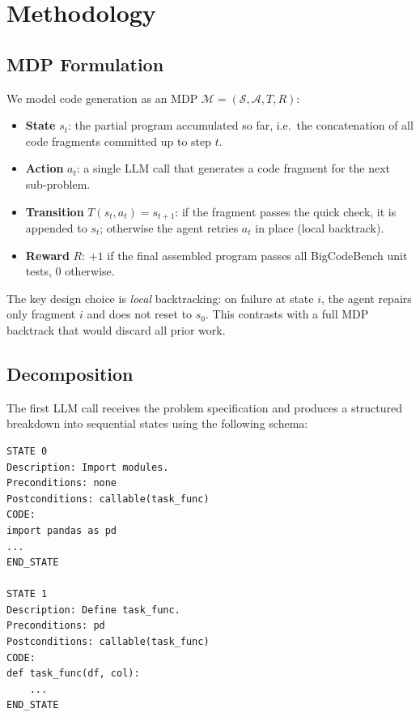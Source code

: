 \documentclass[11pt,twocolumn]{article}
\begin{document}
\section{Methodology}

\subsection{MDP Formulation}

We model code generation as an MDP
$\mathcal{M} = (\mathcal{S}, \mathcal{A}, T, R)$:

\begin{itemize}[leftmargin=1.2em, itemsep=2pt]
  \item \textbf{State} $s_t$: the partial program accumulated so far, i.e.\
        the concatenation of all code fragments committed up to step $t$.
  \item \textbf{Action} $a_t$: a single LLM call that generates a code
        fragment for the next sub-problem.
  \item \textbf{Transition} $T(s_t, a_t) = s_{t+1}$: if the fragment passes
        the quick check, it is appended to $s_t$; otherwise the agent retries
        $a_t$ in place (local backtrack).
  \item \textbf{Reward} $R$: $+1$ if the final assembled program passes all
        BigCodeBench unit tests, $0$ otherwise.
\end{itemize}

The key design choice is \emph{local} backtracking: on failure at state $i$,
the agent repairs only fragment $i$ and does not reset to $s_0$.
This contrasts with a full MDP backtrack that would discard all prior work.

\subsection{Decomposition}

The first LLM call receives the problem specification and produces a
structured breakdown into sequential states using the following schema:

\begin{verbatim}
STATE 0
Description: Import modules.
Preconditions: none
Postconditions: callable(task_func)
CODE:
import pandas as pd
...
END_STATE

STATE 1
Description: Define task_func.
Preconditions: pd
Postconditions: callable(task_func)
CODE:
def task_func(df, col):
    ...
END_STATE
\end{verbatim}
\end{document}
